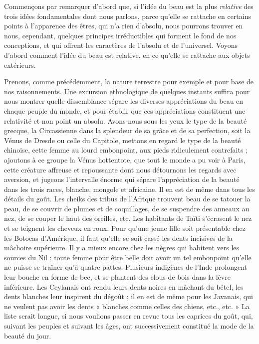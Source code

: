 \documentclass[a4paper, 11pt, oneside]{article}
\begin{document}
Commençons par remarquer d'abord que, si l'idée du beau est la plus \emph{relative} des trois idées fondamentales dont nous parlons, parce qu'elle se rattache en certains points à l'apparence des êtres, qui n'a rien d'absolu, nous pourrons trouver en nous, cependant, quelques principes irréductibles qui forment le fond de nos conceptions, et qui offrent les caractères de l'absolu et de l'universel. Voyons d'abord comment l'idée du beau est relative, en ce qu'elle se rattache aux objets extérieurs.

Prenons, comme précédemment, la nature terrestre pour exemple et pour base de nos raisonnements. Une excursion ethnologique de quelques instants suffira pour nous montrer quelle dissemblance sépare les diverses appréciations du beau en chaque peuple du monde, et pour établir que ces appréciations constituent une relativité et non point un absolu. Avons-nous sous les yeux le type de la beauté grecque, la Circassienne dans la splendeur de sa grâce et de sa perfection, soit la Vénus de Dresde ou celle du Capitole, mettons en regard le type de la beauté chinoise, cette femme au lourd embonpoint, aux pieds ridiculement contrefaits ; ajoutons à ce groupe la Vénus hottentote, que tout le monde a pu voir à Paris, cette créature affreuse et repoussante dont nous détournons les regards avec aversion, et jugeons l'intervalle énorme qui sépare l'appréciation de la beauté dans les trois races, blanche, mongole et africaine. Il en est de même dans tous les détails du goût. Les cheiks des tribus de l'Afrique trouvent beau de se tatouer la peau, de se couvrir de plumes et de coquillages, de se suspendre des anneaux au nez, de se couper le haut des oreilles, etc. Les habitants de Taïti s'écrasent le nez et se teignent les cheveux en roux. Pour qu'une jeune fille soit présentable chez les Botocas d'Amérique, il faut qu'elle se soit cassé les dents incisives de la mâchoire supérieure. Il y a mieux encore chez les nègres qui habitent vers les sources du Nil : toute femme pour être belle doit avoir un tel embonpoint qu'elle ne puisse se traîner qu'à quatre pattes. Plusieurs indigènes de l'Inde prolongent leur bouche en forme de bec, et se plantent des clous de bois dans la lèvre inférieure. Les Ceylanais ont rendu leurs dents noires en mâchant du bétel, les dents blanches leur inspirent du dégoût ; il en est de même pour les Javanais, qui ne veulent pas avoir les dents « blanches comme celles des chiens, etc., etc. » La liste serait longue, si nous voulions passer en revue tous les caprices du goût, qui, suivant les peuples et suivant les âges, ont successivement constitué la mode de la beauté du jour.
\end{document}
